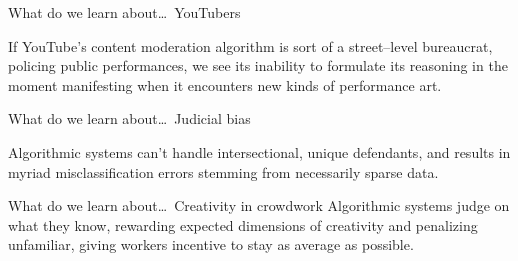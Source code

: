 \documentclass[presentation]{subfiles}
\begin{document}
\begin{frame}{What do we learn about\dots~\alert{YouTubers}}
  
  If YouTube's content moderation algorithm is sort of a street--level bureaucrat, \alert{policing} public performances,
  we see its inability to formulate its reasoning \alert{in the moment} manifesting when it encounters new kinds of performance art.
\end{frame}


\begin{frame}{What do we learn about\dots~\alert{Judicial bias}}

Algorithmic systems can't handle \alert{intersectional}, unique defendants, and results in myriad misclassification errors stemming from \alert{necessarily} sparse data.
\end{frame}


\begin{frame}{What do we learn about\dots~\alert{Creativity in crowdwork}}
Algorithmic systems judge on what they know, rewarding \alert{expected} dimensions of creativity and penalizing unfamiliar, giving workers incentive to stay as \alert{average} as possible.
\end{frame}
\end{document}
